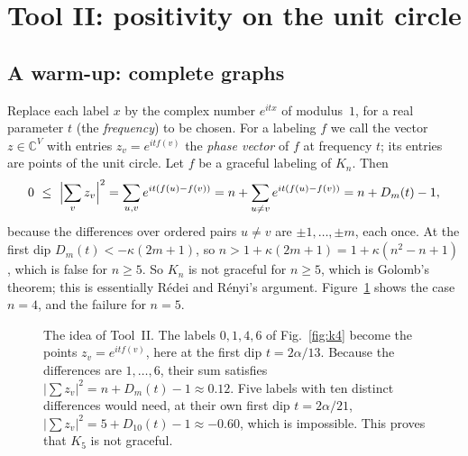 \documentclass[11pt]{amsart}
\theoremstyle{tplain}
\theoremstyle{tdefinition}
\theoremstyle{tremark}
\begin{document}
\section{Tool II: positivity on the unit circle}\label{sec:positivity}

\subsection{A warm-up: complete graphs}

Replace each label $x$ by the complex number $e^{itx}$ of modulus~$1$, for a
real parameter $t$ (the \emph{frequency}) to be chosen. For a labeling $f$ we
call the vector $z\in\mathbb C^V$ with entries $z_v=e^{itf(v)}$ the
\emph{phase vector} of $f$ at frequency $t$; its entries are points of the
unit circle. Let $f$ be a graceful labeling of $K_n$. Then
\[
  0\ \le\ \Bigl|\sum_vz_v\Bigr|^2=\sum_{u,v}e^{it(f(u)-f(v))}
  =n+\sum_{u\ne v}e^{it(f(u)-f(v))}=n+D_m(t)-1,
\]
because the differences over ordered pairs $u\ne v$ are $\pm1,\dots,\pm m$, each
once. At the first dip $D_m(t)<-\kappa(2m+1)$, so
$n>1+\kappa(2m+1)=1+\kappa(n^2-n+1)$, which is false for $n\ge5$. So $K_n$ is
not graceful for $n\ge5$, which is Golomb's theorem; this is essentially
R\'edei and R\'enyi's argument. Figure~\ref{fig:phase} shows the case $n=4$, and the failure for $n=5$.
\begin{figure}[ht]
\centering
{}
\caption{The idea of Tool~II. The labels $0,1,4,6$ of Fig.~\ref{fig:k4} become
the points $z_v=e^{itf(v)}$, here at the first dip $t=2\alpha/13$. Because the differences are $1,\dots,6$, their sum satisfies
$|\sum z_v|^2=n+D_m(t)-1\approx0.12$. Five labels with ten distinct differences
would need, at their own first dip $t=2\alpha/21$,
$|\sum z_v|^2=5+D_{10}(t)-1\approx-0.60$, which is impossible.
This proves that $K_5$ is not graceful.}
\label{fig:phase}
\end{figure}
\end{document}
